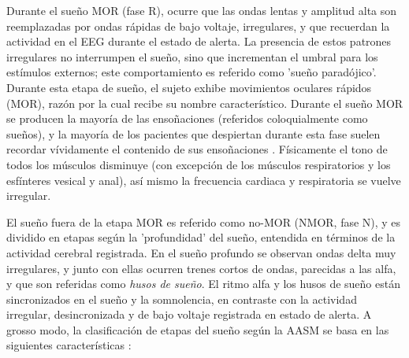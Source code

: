 \documentclass[12pt,a4paper]{mitthesis}
\begin{document}
Durante el sue\~no MOR (fase R), ocurre que las ondas lentas y amplitud alta son reemplazadas por 
ondas r\'apidas de bajo voltaje, irregulares, y que recuerdan la actividad en el EEG durante el 
estado de alerta.
La presencia de estos patrones irregulares no interrumpen el sue\~no, sino que incrementan el 
umbral para los est\'imulos externos; este comportamiento es referido como 'sue\~no parad\'ojico'.
Durante esta etapa de sue\~no, el sujeto exhibe movimientos oculares r\'apidos (MOR), raz\'on por 
la cual recibe su nombre caracter\'istico.
Durante el sue\~no MOR se producen la mayor\'ia de las enso\~naciones (referidos coloquialmente 
como sue\~nos), y la mayor\'ia de los pacientes que despiertan durante esta fase suelen recordar 
v\'ividamente el contenido de sus enso\~naciones \cite{Chokroverty09}.
F\'isicamente el tono de todos los m\'usculos disminuye (con excepci\'on de los m\'usculos 
respiratorios y los esf\'interes vesical y anal), as\'i mismo la frecuencia cardiaca y respiratoria 
se vuelve irregular.

El sue\~no fuera de la etapa MOR es referido como no-MOR (NMOR, fase N), y es dividido en etapas 
seg\'un la 'profundidad' del sue\~no, entendida en t\'erminos de la actividad cerebral registrada.
En el sue\~no profundo se observan ondas delta muy irregulares, y junto con ellas ocurren trenes 
cortos de ondas, parecidas a las alfa, y que son referidas como \textit{husos de sue\~no}. 
El ritmo alfa y los husos de sue\~no est\'an sincronizados en el sue\~no y la somnolencia, en 
contraste con la actividad irregular, desincronizada y de bajo voltaje registrada en estado de 
alerta.
A grosso modo, la clasificaci\'on de etapas del sue\~no seg\'un la AASM se basa en las siguientes
caracter\'isticas \cite{Hori01}:
\end{document}

